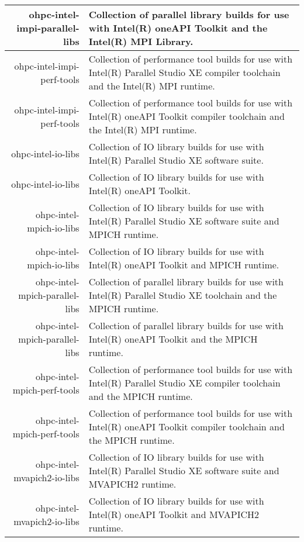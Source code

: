 \begin{tabularx}{\textwidth}{r|X}
\hline
ohpc-intel-impi-parallel-libs & Collection of parallel library builds for use with Intel(R) oneAPI Toolkit and the Intel(R) MPI Library. \\ 
\hline
ohpc-intel-impi-perf-tools & Collection of performance tool builds for use with Intel(R) Parallel Studio XE compiler toolchain and the Intel(R) MPI runtime. \\ 
\hline
ohpc-intel-impi-perf-tools & Collection of performance tool builds for use with Intel(R) oneAPI Toolkit compiler toolchain and the Intel(R) MPI runtime. \\ 
\hline
ohpc-intel-io-libs & Collection of IO library builds for use with Intel(R) Parallel Studio XE software suite. \\ 
\hline
ohpc-intel-io-libs & Collection of IO library builds for use with Intel(R) oneAPI Toolkit. \\ 
\hline
ohpc-intel-mpich-io-libs & Collection of IO library builds for use with Intel(R) Parallel Studio XE software suite and MPICH runtime. \\ 
\hline
ohpc-intel-mpich-io-libs & Collection of IO library builds for use with Intel(R) oneAPI Toolkit and MPICH runtime. \\ 
\hline
ohpc-intel-mpich-parallel-libs & Collection of parallel library builds for use with Intel(R) Parallel Studio XE toolchain and the MPICH runtime. \\ 
\hline
ohpc-intel-mpich-parallel-libs & Collection of parallel library builds for use with Intel(R) oneAPI Toolkit and the MPICH runtime. \\ 
\hline
ohpc-intel-mpich-perf-tools & Collection of performance tool builds for use with Intel(R) Parallel Studio XE compiler toolchain and the MPICH runtime. \\ 
\hline
ohpc-intel-mpich-perf-tools & Collection of performance tool builds for use with Intel(R) oneAPI Toolkit compiler toolchain and the MPICH runtime. \\ 
\hline
ohpc-intel-mvapich2-io-libs & Collection of IO library builds for use with Intel(R) Parallel Studio XE software suite and MVAPICH2 runtime. \\ 
\hline
ohpc-intel-mvapich2-io-libs & Collection of IO library builds for use with Intel(R) oneAPI Toolkit and MVAPICH2 runtime. \\ 
\hline
\bottomrule
\end{tabularx}
